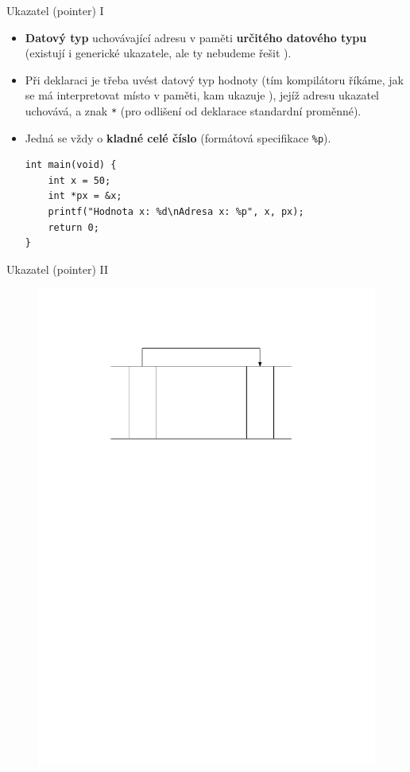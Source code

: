 \documentclass[14pt,aspectratio=169]{beamer}
\begin{document}
    \begin{frame}[t,fragile]{Ukazatel (pointer) I}
        \begin{itemize}
            \item \textbf{Datový typ} uchovávající adresu v paměti \textbf{určitého datového typu} (existují i generické ukazatele, ale ty nebudeme řešit ).
            \item Při deklaraci je třeba uvést datový typ hodnoty (tím kompilátoru říkáme, jak se má interpretovat místo v paměti, kam ukazuje ), jejíž adresu ukazatel uchovává, a znak \texttt{*} (pro odlišení od deklarace standardní proměnné).
            \item Jedná se vždy o \textbf{kladné celé číslo} (formátová specifikace \texttt{\%p}).
            \begin{lstlisting}
int main(void) {
    int x = 50;
    int *px = &x;
    printf("Hodnota x: %d\nAdresa x: %p", x, px);
    return 0;
}
            \end{lstlisting}
        \end{itemize}
    \end{frame}

    \begin{frame}{Ukazatel (pointer) II}
        \begin{figure}
            \centering
            \includegraphics[scale=.75]{images/pointer_to_variable.pdf}
        \end{figure}
    \end{frame}
\end{document}
